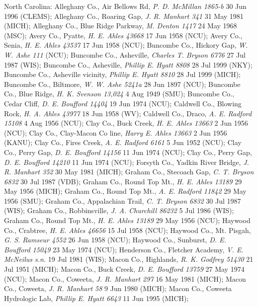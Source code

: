 \documentclass{article}
\begin{document}
\begin{sloppypar}
North Carolina:
Alleghany Co., Air Bellows Rd, \textit{P. D. McMillan 1865-b} 30 Jun 1996 (CLEMS);
Alleghany Co., Roaring Gap, \textit{J. R. Manhart 341} 31 May 1981 (MICH);
Alleghany Co., Blue Ridge Parkway, \textit{M. Denton 1417} 24 May 1968 (MSC);
Avery Co., Pyatte, \textit{H. E. Ahles 43668} 17 Jun 1958 (NCU);
Avery Co., Senia, \textit{H. E. Ahles 43537} 17 Jun 1958 (NCU);
Buncombe Co.,  Hickory Gap, \textit{W. W. Ashe 111}  (NCU);
Buncombe Co., Asheville, \textit{Charles T. Bryson 6776} 27 Jul 1987 (WIS);
Buncombe Co., Asheville, \textit{Phillip E. Hyatt 8808} 28 Jul 1999 (NKY);
Buncombe Co., Asheville vicinity, \textit{Phillip E. Hyatt 8810} 28 Jul 1999 (MICH);
Buncombe Co., Biltmore, \textit{W. W. Ashe 5241a} 28 Jun 1897 (NCU);
Buncombe Co., Blue Ridge, \textit{H. K. Svenson 13,024} 4 Aug 1949 (SMU);
Buncombe Co., Cedar Cliff, \textit{D. E. Boufford 14404} 19 Jun 1974 (NCU);
Caldwell Co., Blowing Rock, \textit{H. A. Ahles 43977} 18 Jun 1958 (WV);
Caldwell Co., Draco, \textit{A. E. Radford 15108} 4 Aug 1956 (NCU);
Clay Co., Buck Creek, \textit{H. E. Ahles 13663} 2 Jun 1956 (NCU);
Clay Co., Clay-Macon Co line, \textit{Harry E. Ahles 13663} 2 Jun 1956 (KANU);
Clay Co., Fires Creek, \textit{A. E. Radford 6161} 5 Jun 1952 (NCU);
Clay Co., Perry Gap, \textit{D. E. Boufford 14156} 11 Jun 1974 (NCU);
Clay Co., Perry Gap, \textit{D. E. Boufford 14210} 11 Jun 1974 (NCU);
Forsyth Co., Yadkin River Bridge, \textit{J. R. Manhart 352} 30 May 1981 (MICH);
Graham Co.,  Stecoach Gap, \textit{C. T. Bryson 6832} 30 Jul 1987 (VDB);
Graham Co.,  Round Top Mt., \textit{H. E. Ahles 13189} 29 May 1956 (MICH);
Graham Co.,  Round Top Mt., \textit{A. E. Radford 11842} 29 May 1956 (SMU);
Graham Co., Appalachian Trail, \textit{C. T. Bryson 6832} 30 Jul 1987 (WIS);
Graham Co., Robbinsville, \textit{J. A. Churchill 86232} 5 Jul 1986 (WIS);
Graham Co., Round Top Mt., \textit{H. E. Ahles 13189} 29 May 1956 (NCU);
Haywood Co., Crabtree, \textit{H. E. Ahles 46656} 15 Jul 1958 (NCU);
Haywood Co., Mt. Pisgah, \textit{G. S. Ramseur 4552} 26 Jun 1958 (NCU);
Haywood Co., Sunburst, \textit{D. E. Boufford 15049} 23 May 1974 (NCU);
Henderson Co., Fletcher Academy, \textit{V. E. McNeilus s.n.} 19 Jul 1981 (WIS);
Macon Co.,  Highlands, \textit{R. K. Godfrey 51430} 21 Jul 1951 (MICH);
Macon Co., Buck Creek, \textit{D. E. Boufford 13759} 27 May 1974 (NCU);
Macon Co., Coweeta, \textit{J. R. Manhart 297} 16 May 1981 (MICH);
Macon Co., Coweeta, \textit{J. R. Manhart 58} 9 Jun 1980 (MICH);
Macon Co., Coweeta Hydrologic Lab, \textit{Phillip E. Hyatt 6643} 11 Jun 1995 (MICH);

\end{sloppypar}
\end{document}
